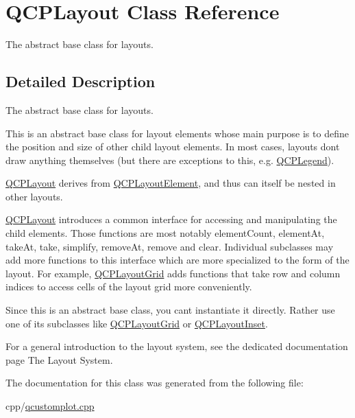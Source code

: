 \hypertarget{class_q_c_p_layout}{}\section{Q\+C\+P\+Layout Class Reference}
\label{class_q_c_p_layout}


The abstract base class for layouts.  




\subsection{Detailed Description}
The abstract base class for layouts. 

This is an abstract base class for layout elements whose main purpose is to define the position and size of other child layout elements. In most cases, layouts don\textquotesingle{}t draw anything themselves (but there are exceptions to this, e.\+g. \mbox{\hyperlink{class_q_c_p_legend}{Q\+C\+P\+Legend}}).

\mbox{\hyperlink{class_q_c_p_layout}{Q\+C\+P\+Layout}} derives from \mbox{\hyperlink{class_q_c_p_layout_element}{Q\+C\+P\+Layout\+Element}}, and thus can itself be nested in other layouts.

\mbox{\hyperlink{class_q_c_p_layout}{Q\+C\+P\+Layout}} introduces a common interface for accessing and manipulating the child elements. Those functions are most notably element\+Count, element\+At, take\+At, take, simplify, remove\+At, remove and clear. Individual subclasses may add more functions to this interface which are more specialized to the form of the layout. For example, \mbox{\hyperlink{class_q_c_p_layout_grid}{Q\+C\+P\+Layout\+Grid}} adds functions that take row and column indices to access cells of the layout grid more conveniently.

Since this is an abstract base class, you can\textquotesingle{}t instantiate it directly. Rather use one of its subclasses like \mbox{\hyperlink{class_q_c_p_layout_grid}{Q\+C\+P\+Layout\+Grid}} or \mbox{\hyperlink{class_q_c_p_layout_inset}{Q\+C\+P\+Layout\+Inset}}.

For a general introduction to the layout system, see the dedicated documentation page The Layout System. 

The documentation for this class was generated from the following file\+:\begin{DoxyCompactItemize}
\item 
cpp/\mbox{\hyperlink{qcustomplot_8cpp}{qcustomplot.\+cpp}}\end{DoxyCompactItemize}
